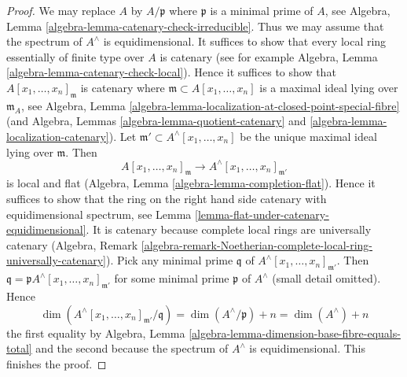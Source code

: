 \documentclass[10pt,a4paper]{amsart}
\theoremstyle{plain}
\theoremstyle{definition}
\theoremstyle{remark}
\numberwithin{equation}{subsection}
\begin{document}
\begin{proof}
We may replace $A$ by $A/\mathfrak p$ where $\mathfrak p$ is a minimal prime
of $A$, see Algebra, Lemma \ref{algebra-lemma-catenary-check-irreducible}.
Thus we may assume that the spectrum of $A^\wedge$ is equidimensional.
It suffices to show that every local ring essentially of finite type
over $A$ is catenary (see for example
Algebra, Lemma \ref{algebra-lemma-catenary-check-local}).
Hence it suffices to show that $A[x_1, \ldots, x_n]_\mathfrak m$ is catenary
where $\mathfrak m \subset A[x_1, \ldots, x_n]$ is a maximal
ideal lying over $\mathfrak m_A$, see
Algebra, Lemma \ref{algebra-lemma-localization-at-closed-point-special-fibre}
(and Algebra, Lemmas \ref{algebra-lemma-quotient-catenary} and
\ref{algebra-lemma-localization-catenary}).
Let $\mathfrak m' \subset A^\wedge[x_1, \ldots, x_n]$ be the unique
maximal ideal lying over $\mathfrak m$. Then
$$
A[x_1, \ldots, x_n]_\mathfrak m \to A^\wedge[x_1, \ldots, x_n]_{\mathfrak m'}
$$
is local and flat (Algebra, Lemma \ref{algebra-lemma-completion-flat}).
Hence it suffices to show that the ring on the right
hand side catenary with equidimensional spectrum, see
Lemma \ref{lemma-flat-under-catenary-equidimensional}.
It is catenary because complete local rings are universally catenary
(Algebra, Remark
\ref{algebra-remark-Noetherian-complete-local-ring-universally-catenary}).
Pick any minimal prime $\mathfrak q$ of
$A^\wedge[x_1, \ldots, x_n]_{\mathfrak m'}$. Then
$\mathfrak q = \mathfrak p A^\wedge[x_1, \ldots, x_n]_{\mathfrak m'}$
for some minimal prime $\mathfrak p$ of $A^\wedge$ (small detail omitted).
Hence
$$
\dim(A^\wedge[x_1, \ldots, x_n]_{\mathfrak m'}/\mathfrak q) =
\dim(A^\wedge/\mathfrak p) + n = \dim(A^\wedge) + n
$$
the first equality by
Algebra, Lemma \ref{algebra-lemma-dimension-base-fibre-equals-total}
and the second because the spectrum of $A^\wedge$ is equidimensional.
This finishes the proof.
\end{proof}
\end{document}
